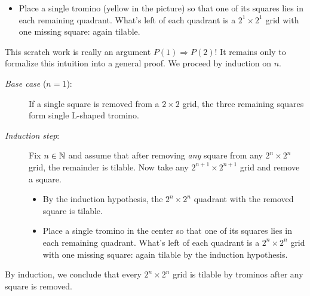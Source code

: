 \begin{example}{}{}
	\begin{itemize}
	 	\item Place a single tromino (yellow in the picture) so that one of its squares lies in each remaining quadrant. What's left of each quadrant is a $2^1\times 2^1$ grid with one missing square: again tilable.
	\end{itemize}
	
	This scratch work is really an argument $P(1)\Longrightarrow P(2)$! It remains only to formalize this intuition into a general proof. We proceed by induction on $n$.
	\begin{description}
		\item[\normalfont\emph{Base case} ($n=1$):] If a single square is removed from a $2\times 2$ grid, the three remaining squares form single L-shaped tromino.
		\item[\normalfont\emph{Induction step}:] Fix $n\in\mathbb{N}$ and assume that after removing \emph{any} square from any $2^n\times 2^n$ grid, the remainder is tilable. Now take any $2^{n+1}\times 2^{n+1}$ grid and remove a square.
	\begin{itemize}
	  \item By the induction hypothesis, the $2^n\times 2^n$ quadrant with the removed square is tilable.
	  \item Place a single tromino in the center so that one of its squares lies in each remaining quadrant. What's left of each quadrant is a $2^n\times 2^n$ grid with one missing square: again tilable by the induction hypothesis.
	\end{itemize}  
	\end{description}
	By induction, we conclude that every $2^n\times 2^n$ grid is tilable by trominos after any square is removed.
\end{example}


\goodbreak


